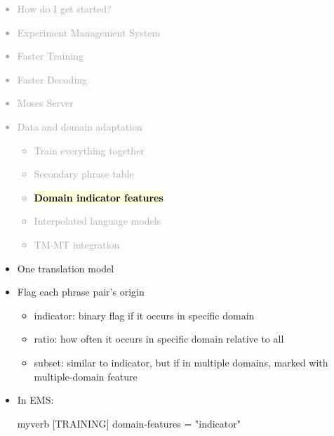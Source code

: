 \documentclass[landscape]{uedslides2C}
\newcommand{\currenttopic}[1]{\colorbox{lightyellow}{\textcolor{black}{\bf #1}}}
\begin{document}

\vspace{-5mm}
\textcolor{darkgrey}{
\begin{itemize} \itemsep -1mm
\item {How do I get started?}
\item {Experiment Management System}
\item {Faster Training}
\item {Faster Decoding}
\item {Moses Server}
\item {Data and domain adaptation}
  \begin{itemize} \vspace{-5mm}
  \item {Train everything together}
  \item {Secondary phrase table}
  \item \currenttopic{Domain indicator features}
\item Interpolated language models
  \item TM-MT integration
  \end{itemize}
\end{itemize}
}


\vspace{15mm}
\begin{itemize} \itemsep 5mm
\item One translation model
\item Flag each phrase pair's origin
\begin{itemize}
\item indicator: binary flag if it occurs in specific domain
\item ratio: how often it occurs in specific domain relative to all
\item subset: similar to indicator, but if in multiple domains, marked with multiple-domain feature
\end{itemize}
\item In EMS:\\[4mm] \small
\begin{SaveVerbatim}{myverb}
  [TRAINING]
  domain-features = "indicator"
\end{SaveVerbatim}
\colorbox{gray}{}
\end{itemize}
\end{document}

